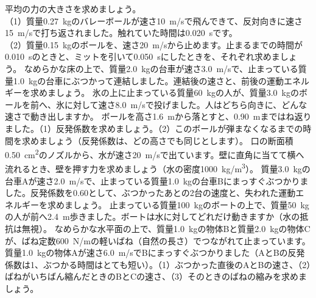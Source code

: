 \bkendproblems
{}
\bkproblem 平均の力の大きさを求めましょう。\\
（1）質量\qty{0.27}{kg}のバレーボールが速さ\qty{10}{m/s}で飛んできて、反対向きに速さ\qty{15}{m/s}で打ち返されました。触れていた時間は\qty{0.020}{s}です。\\
（2）質量\qty{0.15}{kg}のボールを、速さ\qty{20}{m/s}から止めます。止まるまでの時間が\qty{0.010}{s}のときと、ミットを引いて\qty{0.050}{s}にしたときを、それぞれ求めましょう。
\bkproblem なめらかな床の上で、質量\qty{2.0}{kg}の台車が速さ\qty{3.0}{m/s}で、止まっている質量\qty{1.0}{kg}の台車にぶつかって連結しました。連結後の速さと、前後の運動エネルギーを求めましょう。
\bkproblem 氷の上に止まっている質量\qty{60}{kg}の人が、質量\qty{3.0}{kg}のボールを前へ、氷に対して速さ\qty{8.0}{m/s}で投げました。人はどちら向きに、どんな速さで動き出しますか。
\bkproblem ボールを高さ\qty{1.6}{m}から落とすと、\qty{0.90}{m}まではね返りました。（1）反発係数を求めましょう。（2）このボールが弾まなくなるまでの時間を求めましょう（反発係数は、どの高さでも同じとします）。
\bkproblem 口の断面積\qty{0.50}{cm^2}のノズルから、水が速さ\qty{20}{m/s}で出ています。壁に直角に当てて横へ流れるとき、壁を押す力を求めましょう（水の密度\qty{1000}{kg/m^3}）。
\bkproblem 質量\qty{3.0}{kg}の台車Aが速さ\qty{2.0}{m/s}で、止まっている質量\qty{1.0}{kg}の台車Bにまっすぐぶつかりました。反発係数を0.60として、ぶつかったあとの2台の速度と、失われた運動エネルギーを求めましょう。
\bkproblem 止まっている質量\qty{100}{kg}のボートの上で、質量\qty{50}{kg}の人が前へ\qty{2.4}{m}歩きました。ボートは水に対してどれだけ動きますか（水の抵抗は無視）。
\bkproblem なめらかな水平面の上で、質量\qty{1.0}{kg}の物体Bと質量\qty{2.0}{kg}の物体Cが、ばね定数\qty{600}{N/m}の軽いばね（自然の長さ）でつながれて止まっています。質量\qty{1.0}{kg}の物体Aが速さ\qty{6.0}{m/s}でBにまっすぐぶつかりました（AとBの反発係数は1、ぶつかる時間はとても短い）。（1）ぶつかった直後のAとBの速さ、（2）ばねがいちばん縮んだときのBとCの速さ、（3）そのときのばねの縮みを求めましょう。
